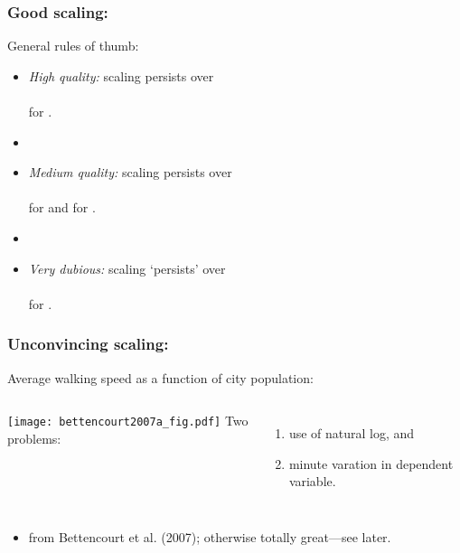 \begin{frame}
  \frametitle{Good scaling:}

  \begin{block}{General rules of thumb:}
    \begin{itemize}
    \item<1->
      \textit{High quality:} scaling persists over\\
      \\
      for .
    \item[]
    \item<2->
      \textit{Medium quality:} scaling persists over \\
      \\
      for  and 
       for .
    \item[]
    \item<3->
      \textit{Very dubious:} scaling `persists' over\\
      \\
      for .
    \end{itemize}
  \end{block}

\end{frame}

\begin{frame}
  \frametitle{Unconvincing scaling:}

  \begin{block}{Average walking speed as a function of city population:}
    \begin{columns}
      \texttt{[image: bettencourt2007a\_fig.pdf]}
      Two problems:
      \begin{enumerate}
      \item 
        use of natural log, and
      \item 
        minute varation in dependent variable.
      \end{enumerate}
    \end{columns}
    \begin{itemize}
    \item 
      {\small from Bettencourt et al. (2007)\cite{bettencourt2007a};
        otherwise totally great---see later.}
    \end{itemize}
  \end{block}

\end{frame}

